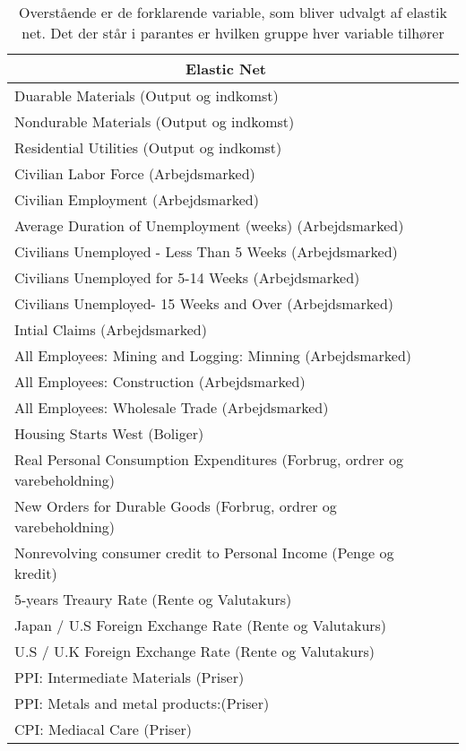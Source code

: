 \begin{table}
\small
\center
\begin{tabular}{lcc}
\toprule
\multicolumn{2}{c}{Elastic Net} \\ \midrule
Duarable Materials (Output og indkomst) & \\
Nondurable Materials (Output og indkomst) &\\
Residential Utilities (Output og indkomst) &\\
Civilian Labor Force (Arbejdsmarked) &\\
Civilian Employment (Arbejdsmarked) &\\
Average Duration of Unemployment (weeks) (Arbejdsmarked) &\\
Civilians Unemployed - Less Than 5 Weeks (Arbejdsmarked) &\\
Civilians Unemployed for 5-14 Weeks (Arbejdsmarked) &\\
Civilians Unemployed- 15 Weeks and Over (Arbejdsmarked)& \\
Intial Claims (Arbejdsmarked) &\\
All Employees: Mining and Logging: Minning (Arbejdsmarked) & \\
All Employees: Construction (Arbejdsmarked) &\\
All Employees:  Wholesale Trade (Arbejdsmarked) &\\
Housing Starts West (Boliger) &\\
Real Personal Consumption Expenditures (Forbrug, ordrer og varebeholdning)& \\
New Orders for Durable Goods (Forbrug, ordrer og varebeholdning)&\\
Nonrevolving consumer credit to Personal Income (Penge og kredit) &\\
5-years Treaury Rate (Rente og Valutakurs) &\\
Japan / U.S Foreign Exchange Rate (Rente og Valutakurs) &\\
U.S / U.K Foreign Exchange Rate (Rente og Valutakurs)& \\
PPI: Intermediate Materials (Priser)& \\
PPI: Metals and metal products:(Priser) &\\
CPI: Mediacal Care (Priser)& \\ \bottomrule
\end{tabular}
\caption{Overstående er de forklarende variable, som bliver udvalgt af elastik net. Det der står i parantes er hvilken gruppe hver variable tilhører} \label{tab: el_ud}
\end{table}


